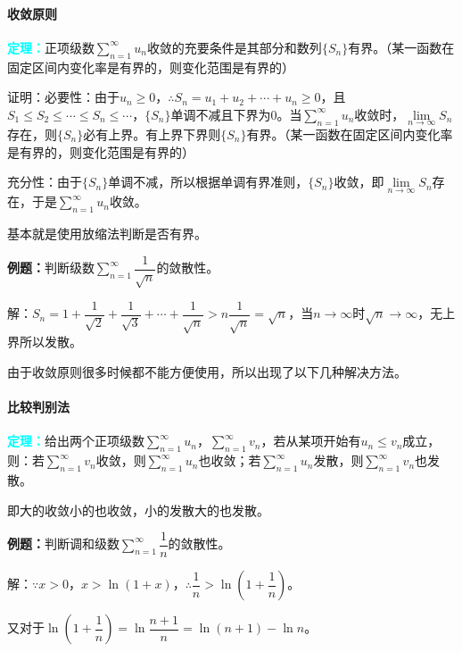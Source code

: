 \paragraph{收敛原则} \leavevmode \medskip

\textcolor{aqua}{\textbf{定理：}}正项级数$\sum\limits_{n=1}^\infty u_n$收敛的充要条件是其部分和数列$\{S_n\}$有界。（某一函数在固定区间内变化率是有界的，则变化范围是有界的）

证明：必要性：由于$u_n\geqslant0$，$\therefore S_n=u_1+u_2+\cdots+u_n\geqslant0$，且$S_1\leqslant S_2\leqslant\cdots\leqslant S_n\leqslant\cdots$，$\{S_n\}$单调不减且下界为0。当$\sum\limits_{n=1}^\infty u_n$收敛时，$\lim\limits_{n\to\infty}S_n$存在，则$\{S_n\}$必有上界。有上界下界则$\{S_n\}$有界。（某一函数在固定区间内变化率是有界的，则变化范围是有界的）

充分性：由于$\{S_n\}$单调不减，所以根据单调有界准则，$\{S_n\}$收敛，即$\lim\limits_{n\to\infty}S_n$存在，于是$\sum\limits_{n=1}^\infty u_n$收敛。

基本就是使用放缩法判断是否有界。

\textbf{例题：}判断级数$\sum\limits_{n=1}^\infty\dfrac{1}{\sqrt{n}}$的敛散性。

解：$S_n=1+\dfrac{1}{\sqrt{2}}+\dfrac{1}{\sqrt{3}}+\cdots+\dfrac{1}{\sqrt{n}}>n\dfrac{1}{\sqrt{n}}=\sqrt{n}$，当$n\to\infty$时$\sqrt{n}\to\infty$，无上界所以发散。

由于收敛原则很多时候都不能方便使用，所以出现了以下几种解决方法。

\paragraph{比较判别法} \leavevmode \medskip

\textcolor{aqua}{\textbf{定理：}}给出两个正项级数$\sum\limits_{n=1}^\infty u_n$，$\sum\limits_{n=1}^\infty v_n$，若从某项开始有$u_n\leqslant v_n$成立，则：若$\sum\limits_{n=1}^\infty v_n$收敛，则$\sum\limits_{n=1}^\infty u_n$也收敛；若$\sum\limits_{n=1}^\infty u_n$发散，则$\sum\limits_{n=1}^\infty v_n$也发散。

即大的收敛小的也收敛，小的发散大的也发散。

\textbf{例题：}判断调和级数$\sum\limits_{n=1}^\infty\dfrac{1}{n}$的敛散性。

解：$\because x>0$，$x>\ln(1+x)$，$\therefore\dfrac{1}{n}>\ln\left(1+\dfrac{1}{n}\right)$。

又对于$\ln\left(1+\dfrac{1}{n}\right)=\ln\dfrac{n+1}{n}=\ln(n+1)-\ln n$。

